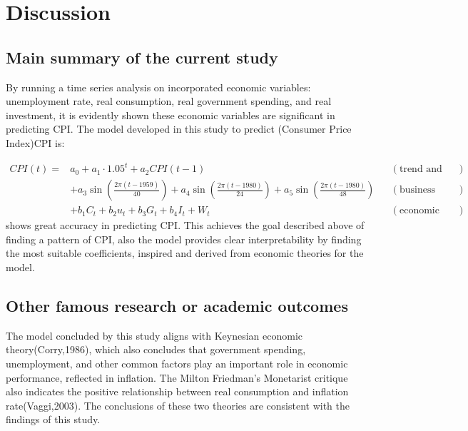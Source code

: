 \documentclass[
  man,floatsintext,
  man]{apa6}
\begin{document}
\hypertarget{discussion}{%
\section{Discussion}\label{discussion}}

\hypertarget{main-summary-of-the-current-study}{%
\subsection{Main summary of the current study}\label{main-summary-of-the-current-study}}

By running a time series analysis on incorporated economic variables: unemployment rate, real consumption, real government spending, and real investment, it is evidently shown these economic variables are significant in predicting CPI. The model developed in this study to predict (Consumer Price Index)CPI is:

\begin{align*}
CPI(t) =& a_0 + a_1 \cdot 1.05^t + a_2 CPI(t-1)  && (\text{trend and lags})\\
& + a_3 \sin\left(\frac{2\pi(t-1959)}{40}\right) + a_4 \sin\left(\frac{2\pi(t-1980)}{24}\right) + a_5 \sin\left(\frac{2\pi(t-1980)}{48}\right) && (\text{business cycle})\\
& + b_1 C_t + b_2 u_t + b_3 G_t + b_4 I_t + W_t && (\text{economic variables})
\end{align*}
shows great accuracy in predicting CPI. This achieves the goal described above of finding a pattern of CPI, also the model provides clear interpretability by finding the most suitable coefficients, inspired and derived from economic theories for the model.

\hypertarget{other-famous-research-or-academic-outcomes}{%
\subsection{Other famous research or academic outcomes}\label{other-famous-research-or-academic-outcomes}}

The model concluded by this study aligns with Keynesian economic theory(Corry,1986), which also concludes that government spending, unemployment, and other common factors play an important role in economic performance, reflected in inflation. The Milton Friedman's Monetarist critique also indicates the positive relationship between real consumption and inflation rate(Vaggi,2003). The conclusions of these two theories are consistent with the findings of this study.
\end{document}
